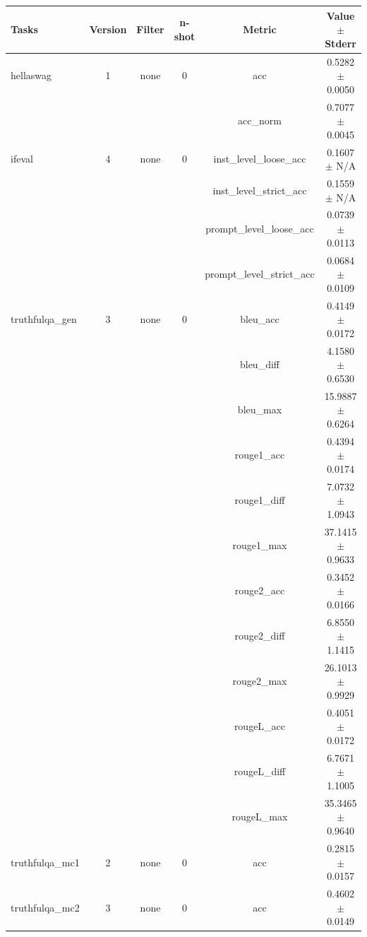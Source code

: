 \documentclass{ifacconf}
\begin{document}
\vfill
\clearpage
\pagebreak

\begin{strip}
\begin{minipage}{\textwidth}
\begin{table}[H]
    \centering
    \begin{tabular}{|l|c|c|c|c|c|}
    \hline
    \textbf{Tasks} & \textbf{Version} & \textbf{Filter} & \textbf{n-shot} & \textbf{Metric} & \textbf{Value} $\pm$ \textbf{Stderr} \\ \hline
    hellaswag & 1 & none & 0 & acc & 0.5282 $\pm$ 0.0050 \\ \hline
    & & & & acc\_norm & 0.7077 $\pm$ 0.0045 \\ \hline
    ifeval & 4 & none & 0 & inst\_level\_loose\_acc & 0.1607 $\pm$ N/A \\ \hline
    & & & & inst\_level\_strict\_acc & 0.1559 $\pm$ N/A \\ \hline
    & & & & prompt\_level\_loose\_acc & 0.0739 $\pm$ 0.0113 \\ \hline
    & & & & prompt\_level\_strict\_acc & 0.0684 $\pm$ 0.0109 \\ \hline
    truthfulqa\_gen & 3 & none & 0 & bleu\_acc & 0.4149 $\pm$ 0.0172 \\ \hline
    & & & & bleu\_diff & 4.1580 $\pm$ 0.6530 \\ \hline
    & & & & bleu\_max & 15.9887 $\pm$ 0.6264 \\ \hline
    & & & & rouge1\_acc & 0.4394 $\pm$ 0.0174 \\ \hline
    & & & & rouge1\_diff & 7.0732 $\pm$ 1.0943 \\ \hline
    & & & & rouge1\_max & 37.1415 $\pm$ 0.9633 \\ \hline
    & & & & rouge2\_acc & 0.3452 $\pm$ 0.0166 \\ \hline
    & & & & rouge2\_diff & 6.8550 $\pm$ 1.1415 \\ \hline
    & & & & rouge2\_max & 26.1013 $\pm$ 0.9929 \\ \hline
    & & & & rougeL\_acc & 0.4051 $\pm$ 0.0172 \\ \hline
    & & & & rougeL\_diff & 6.7671 $\pm$ 1.1005 \\ \hline
    & & & & rougeL\_max & 35.3465 $\pm$ 0.9640 \\ \hline
    truthfulqa\_mc1 & 2 & none & 0 & acc & 0.2815 $\pm$ 0.0157 \\ \hline
    truthfulqa\_mc2 & 3 & none & 0 & acc & 0.4602 $\pm$ 0.0149 \\ \hline
    \end{tabular}
    \label{tab:llama31_q5km}
    \end{table}


\end{minipage}
\end{strip}
\end{document}
